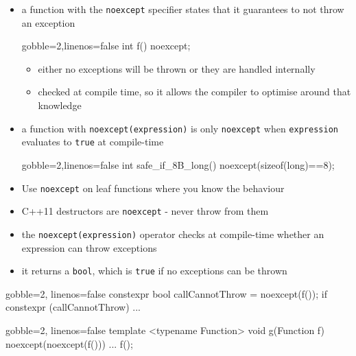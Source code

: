 \begin{frame}[fragile]
  \begin{block}{}
    \begin{itemize}
      \item a function with the \texttt{noexcept} specifier states that it guarantees to not throw an exception
      \begin{cppcode*}{gobble=2,linenos=false}
        int f() noexcept;
      \end{cppcode*}
      \begin{itemize}
        \item either no exceptions will be thrown or they are handled internally
        \item checked at compile time, so it allows the compiler to optimise around that knowledge
      \end{itemize}
      \item a function with \texttt{noexcept(expression)} is only \texttt{noexcept} when \texttt{expression} evaluates to \texttt{true} at compile-time
      \begin{cppcode*}{gobble=2,linenos=false}
        int safe_if_8B_long() noexcept(sizeof(long)==8);
      \end{cppcode*}
      \item Use \texttt{noexcept} on leaf functions where you know the behaviour
      \item C++11 destructors are \texttt{noexcept} - never throw from them
    \end{itemize}
  \end{block}
\end{frame}


\begin{frame}[fragile]
  \begin{block}{}
    \begin{itemize}
      \item the \texttt{noexcept(expression)} operator checks at compile-time whether an expression can throw exceptions
      \item it returns a \texttt{bool}, which is \texttt{true} if no exceptions can be thrown
    \end{itemize}
  \end{block}
  \begin{block}{}
    \begin{cppcode*}{gobble=2, linenos=false}
      constexpr bool callCannotThrow = noexcept(f());
      if constexpr (callCannotThrow) { ... }
    \end{cppcode*}
  \end{block}
  \begin{block}{}
    \begin{cppcode*}{gobble=2, linenos=false}
      template <typename Function>
      void g(Function f) noexcept(noexcept(f())) {
        ...
        f();
      }
    \end{cppcode*}
  \end{block}
\end{frame}
